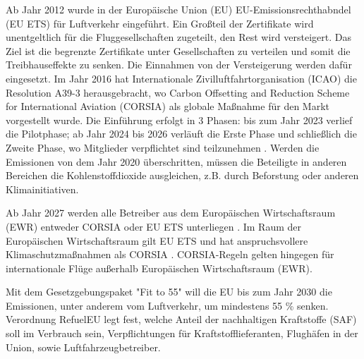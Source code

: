 Ab Jahr 2012 wurde in der Europäische Union (EU) EU-Emissionsrechthabndel (EU ETS) für Luftverkehr eingeführt.
Ein Großteil der Zertifikate wird unentgeltlich für die Fluggesellschaften zugeteilt, den Rest wird versteigert. 
Das Ziel ist die begrenzte Zertifikate unter Gesellschaften zu verteilen und somit die Treibhauseffekte zu senken.
Die Einnahmen von der Versteigerung werden dafür eingesetzt.\cite{conrady2019luftverkehr}
Im Jahr 2016 hat Internationale Zivilluftfahrtorganisation (ICAO) die Resolution A39-3 herausgebracht, 
wo Carbon Offsetting and Reduction Scheme for International Aviation (CORSIA) als globale Maßnahme für den Markt vorgestellt wurde. 
Die Einführung erfolgt in 3 Phasen: 
bis zum Jahr 2023 verlief die Pilotphase; ab Jahr 2024 bis 2026 verläuft die Erste Phase und schließlich die Zweite Phase, wo Mitglieder verpflichtet sind 
teilzunehmen \cite{conrady2019luftverkehr}. 
Werden die Emissionen von dem Jahr 2020 überschritten, müssen die Beteiligte in anderen Bereichen die Kohlenstoffdioxide ausgleichen, z.B.
durch Beforstung oder anderen Klimainitiativen. 

Ab Jahr 2027 werden alle Betreiber aus dem Europäischen Wirtschaftsraum (EWR) entweder CORSIA oder EU ETS unterliegen \cite{uba_aviation_2023}.
Im Raum der Europäischen Wirtschaftsraum gilt EU ETS und hat anspruchsvollere Klimaschutzmaßnahmen als CORSIA \cite{uba_aviation_2023}.
CORSIA-Regeln gelten hingegen für internationale Flüge außerhalb Europäischen Wirtschaftsraum (EWR).

Mit dem Gesetzgebungspaket "Fit to 55" will die EU bis zum Jahr 2030 die Emissionen, unter anderem vom Luftverkehr, um mindestens 55 \% senken.
Verordnung RefuelEU legt fest, welche Anteil der nachhaltigen Kraftstoffe (SAF) soll im Verbrauch sein, Verpflichtungen für 
Kraftstofflieferanten, Flughäfen in der Union, sowie Luftfahrzeugbetreiber.
